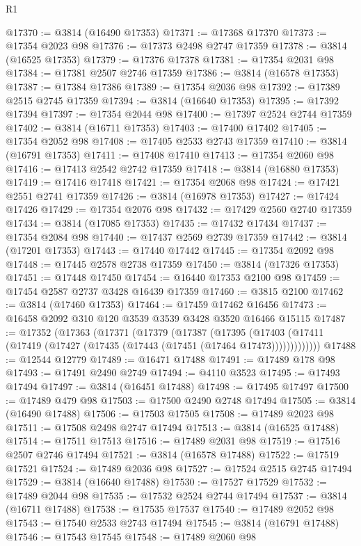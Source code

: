 \begin{lexlean}{R1}
\begin{coremodule}
@17370 := @3814 (@16490 @17353)
@17371 := @17368 @17370
@17373 := @17354 @2023 @98
@17376 := @17373 @2498 @2747 @17359
@17378 := @3814 (@16525 @17353)
@17379 := @17376 @17378
@17381 := @17354 @2031 @98
@17384 := @17381 @2507 @2746 @17359
@17386 := @3814 (@16578 @17353)
@17387 := @17384 @17386
@17389 := @17354 @2036 @98
@17392 := @17389 @2515 @2745 @17359
@17394 := @3814 (@16640 @17353)
@17395 := @17392 @17394
@17397 := @17354 @2044 @98
@17400 := @17397 @2524 @2744 @17359
@17402 := @3814 (@16711 @17353)
@17403 := @17400 @17402
@17405 := @17354 @2052 @98
@17408 := @17405 @2533 @2743 @17359
@17410 := @3814 (@16791 @17353)
@17411 := @17408 @17410
@17413 := @17354 @2060 @98
@17416 := @17413 @2542 @2742 @17359
@17418 := @3814 (@16880 @17353)
@17419 := @17416 @17418
@17421 := @17354 @2068 @98
@17424 := @17421 @2551 @2741 @17359
@17426 := @3814 (@16978 @17353)
@17427 := @17424 @17426
@17429 := @17354 @2076 @98
@17432 := @17429 @2560 @2740 @17359
@17434 := @3814 (@17085 @17353)
@17435 := @17432 @17434
@17437 := @17354 @2084 @98
@17440 := @17437 @2569 @2739 @17359
@17442 := @3814 (@17201 @17353)
@17443 := @17440 @17442
@17445 := @17354 @2092 @98
@17448 := @17445 @2578 @2738 @17359
@17450 := @3814 (@17326 @17353)
@17451 := @17448 @17450
@17454 := @16440 @17353 @2100 @98
@17459 := @17454 @2587 @2737 @3428 @16439 @17359
@17460 := @3815 @2100
@17462 := @3814 (@17460 @17353)
@17464 := @17459 @17462 @16456
@17473 := @16458 @2092 @310 @120 @3539 @3539 @3428 @3520 @16466 @15115
@17487 := @17352
    (@17363
      (@17371
        (@17379
          (@17387
            (@17395
              (@17403 (@17411 (@17419 (@17427 (@17435 (@17443 (@17451 (@17464 @17473)))))))))))))
@17488 := @12544 @12779
@17489 := @16471 @17488
@17491 := @17489 @178 @98
@17493 := @17491 @2490 @2749
@17494 := @4110 @3523
@17495 := @17493 @17494
@17497 := @3814 (@16451 @17488)
@17498 := @17495 @17497
@17500 := @17489 @479 @98
@17503 := @17500 @2490 @2748 @17494
@17505 := @3814 (@16490 @17488)
@17506 := @17503 @17505
@17508 := @17489 @2023 @98
@17511 := @17508 @2498 @2747 @17494
@17513 := @3814 (@16525 @17488)
@17514 := @17511 @17513
@17516 := @17489 @2031 @98
@17519 := @17516 @2507 @2746 @17494
@17521 := @3814 (@16578 @17488)
@17522 := @17519 @17521
@17524 := @17489 @2036 @98
@17527 := @17524 @2515 @2745 @17494
@17529 := @3814 (@16640 @17488)
@17530 := @17527 @17529
@17532 := @17489 @2044 @98
@17535 := @17532 @2524 @2744 @17494
@17537 := @3814 (@16711 @17488)
@17538 := @17535 @17537
@17540 := @17489 @2052 @98
@17543 := @17540 @2533 @2743 @17494
@17545 := @3814 (@16791 @17488)
@17546 := @17543 @17545
@17548 := @17489 @2060 @98

\end{coremodule}
\end{lexlean}
